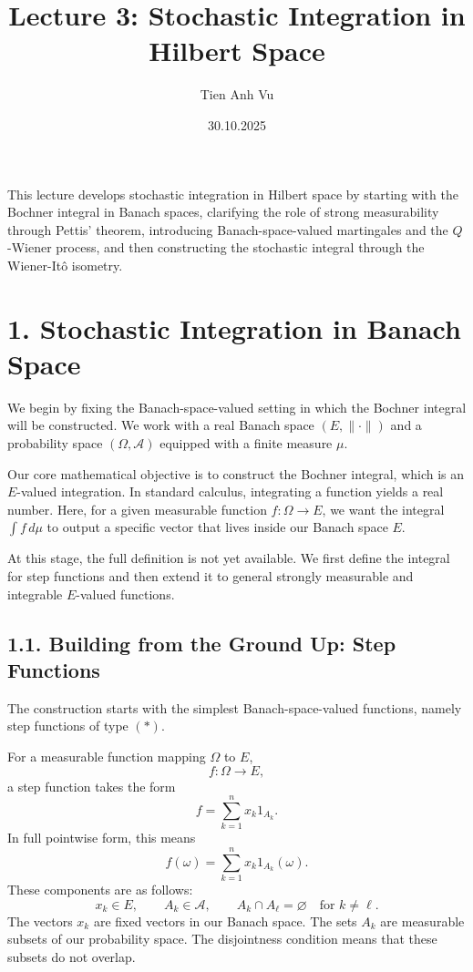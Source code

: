 \documentclass[11pt]{article}
\title{Lecture 3: Stochastic Integration in Hilbert Space}
\date{30.10.2025}
\author{Tien Anh Vu}
\theoremstyle{definition}
\theoremstyle{remark}
\begin{document}
\maketitle

This lecture develops stochastic integration in Hilbert space by starting with the Bochner integral in Banach spaces, clarifying the role of strong measurability through Pettis' theorem, introducing Banach-space-valued martingales and the \(Q\)-Wiener process, and then constructing the stochastic integral through the Wiener-It\^o isometry.

\section*{1. Stochastic Integration in Banach Space}
We begin by fixing the Banach-space-valued setting in which the Bochner integral will be constructed. We work with a real Banach space \((E,\|\cdot\|)\) and a probability space \((\Omega,\mathcal A)\) equipped with a finite measure \(\mu\).

Our core mathematical objective is to construct the Bochner integral, which is an \(E\)-valued integration. In standard calculus, integrating a function yields a real number. Here, for a given measurable function \(f:\Omega\to E\), we want the integral \(\int f\,d\mu\) to output a specific vector that lives inside our Banach space \(E\).

At this stage, the full definition is not yet available. We first define the integral for step functions and then extend it to general strongly measurable and integrable \(E\)-valued functions.

\subsection*{1.1. Building from the Ground Up: Step Functions}
The construction starts with the simplest Banach-space-valued functions, namely step functions of type \((*)\).

For a measurable function mapping \(\Omega\) to \(E\),
\[
f:\Omega\to E,
\]
a step function takes the form
\[
f=\sum_{k=1}^{n} x_k 1_{A_k}. \tag{*}
\]
In full pointwise form, this means
\[
f(\omega)=\sum_{k=1}^{n} x_k 1_{A_k}(\omega).
\]
These components are as follows:
\[
x_k\in E,
\qquad
A_k\in \mathcal A,
\qquad
A_k\cap A_\ell=\varnothing \quad \text{for } k\neq \ell.
\]
The vectors \(x_k\) are fixed vectors in our Banach space. The sets \(A_k\) are measurable subsets of our probability space. The disjointness condition means that these subsets do not overlap.
\end{document}
